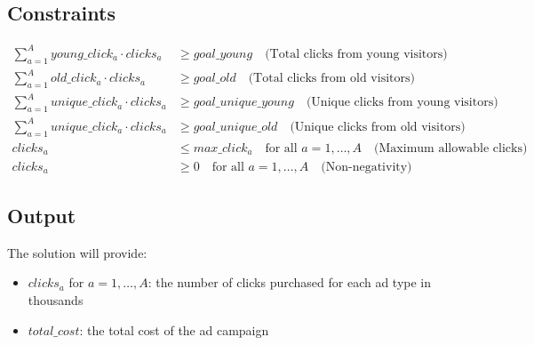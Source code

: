\documentclass{article}
\begin{document}
\subsection*{Constraints}
\begin{align*}
\sum_{a=1}^{A} young\_click_a \cdot clicks_a & \geq goal\_young \quad \text{(Total clicks from young visitors)} \\
\sum_{a=1}^{A} old\_click_a \cdot clicks_a & \geq goal\_old \quad \text{(Total clicks from old visitors)} \\
\sum_{a=1}^{A} unique\_click_a \cdot clicks_a & \geq goal\_unique\_young \quad \text{(Unique clicks from young visitors)} \\
\sum_{a=1}^{A} unique\_click_a \cdot clicks_a & \geq goal\_unique\_old \quad \text{(Unique clicks from old visitors)} \\
clicks_a & \leq max\_click_a \quad \text{for all } a = 1, \ldots, A \quad \text{(Maximum allowable clicks)} \\
clicks_a & \geq 0 \quad \text{for all } a = 1, \ldots, A \quad \text{(Non-negativity)}
\end{align*}

\subsection*{Output}
The solution will provide:
\begin{itemize}
    \item $clicks_a$ for $a = 1, \ldots, A$: the number of clicks purchased for each ad type in thousands
    \item $total\_cost$: the total cost of the ad campaign
\end{itemize}
\end{document}
